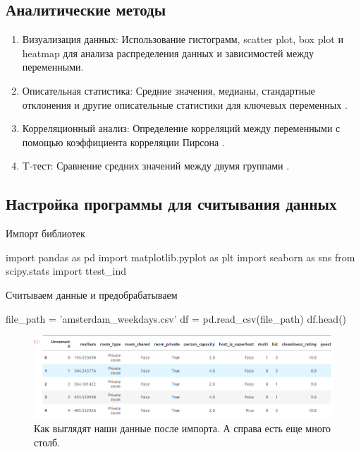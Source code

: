 \documentclass[
	11pt
] {article}
\begin{document}
\subsection{Аналитические методы}
	\begin{enumerate}
		\item Визуализация данных: Использование гистограмм, scatter plot, box plot и heatmap для анализа распределения данных и зависимостей между переменными.

		\item Описательная статистика: Средние значения, медианы, стандартные отклонения и другие описательные статистики для ключевых переменных \cite{mishra2019descriptive}.

		\item Корреляционный анализ: Определение корреляций между переменными с помощью коэффициента корреляции Пирсона \cite{cohen2009pearson}.

		\item T-тест: Сравнение средних значений между двумя группами \cite{kim2015t}.
	\end{enumerate}

\subsection{Настройка программы для считывания данных}
	Импорт библиотек

\begin{python}
import pandas as pd
import matplotlib.pyplot as plt
import seaborn as sns
from scipy.stats import ttest_ind
\end{python}

	Считываем данные и предобрабатываем

\begin{python}
file_path = 'amsterdam_weekdays.csv'
df = pd.read_csv(file_path)
df.head()
\end{python}

	\begin{figure}[H]
		\centering
		\includegraphics[width=1.0\textwidth]{fig-00}
		\caption{Как выглядят наши данные после импорта. А справа есть еще много столб.}
	\end{figure}
\end{document}
